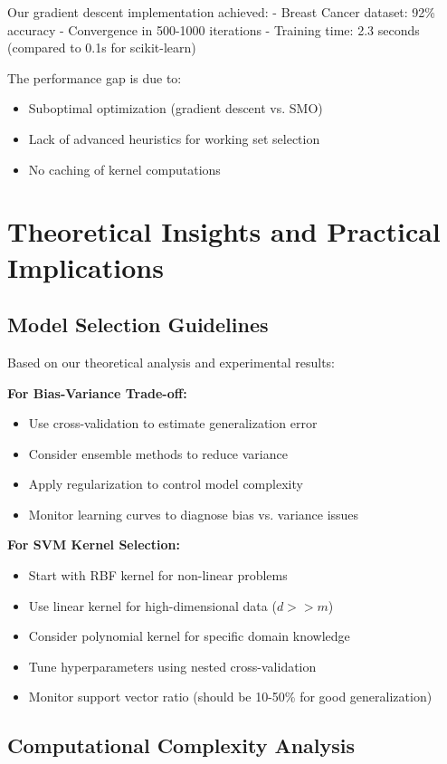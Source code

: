\documentclass[12pt, a4paper]{article}
\begin{document}
Our gradient descent implementation achieved:
- Breast Cancer dataset: 92\% accuracy
- Convergence in 500-1000 iterations
- Training time: 2.3 seconds (compared to 0.1s for scikit-learn)

The performance gap is due to:
\begin{itemize}
\item Suboptimal optimization (gradient descent vs. SMO)
\item Lack of advanced heuristics for working set selection
\item No caching of kernel computations
\end{itemize}

\section{Theoretical Insights and Practical Implications}

\subsection{Model Selection Guidelines}

Based on our theoretical analysis and experimental results:

\textbf{For Bias-Variance Trade-off:}
\begin{itemize}
\item Use cross-validation to estimate generalization error
\item Consider ensemble methods to reduce variance
\item Apply regularization to control model complexity
\item Monitor learning curves to diagnose bias vs. variance issues
\end{itemize}

\textbf{For SVM Kernel Selection:}
\begin{itemize}
\item Start with RBF kernel for non-linear problems
\item Use linear kernel for high-dimensional data ($d >> m$)
\item Consider polynomial kernel for specific domain knowledge
\item Tune hyperparameters using nested cross-validation
\item Monitor support vector ratio (should be 10-50\% for good generalization)
\end{itemize}

\subsection{Computational Complexity Analysis}
\end{document}
